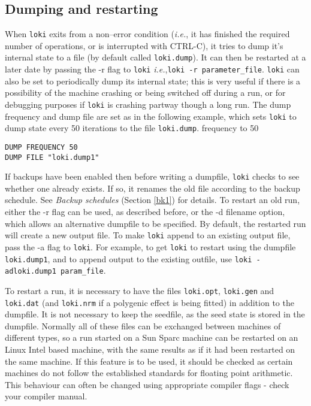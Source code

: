 \documentclass[10pt,a4paper]{article}
\newcommand{\IE}{\textit{i.e.},\xspace}
\newcommand{\Loki}{\texttt{loki}\xspace}
\begin{document}
\subsection{Dumping and restarting}
When \Loki exits from a non--error condition (\IE it has finished the
required number of operations, or is interrupted with CTRL-C), it tries to
dump it's internal state to a file (by default called \verb+loki.dump+).  It
can then be restarted at a later date by passing the -r flag to \Loki
\IE\verb+loki -r parameter_file+.  \Loki can also be set to periodically
dump its internal state; this is very useful if there is a possibility of
the machine crashing or being switched off during a run, or for debugging
purposes if \Loki is crashing partway though a long run.  The dump frequency
and dump file are set as in the following example, which sets \Loki to dump
state every 50 iterations to the file \verb+loki.dump+.
frequency to 50
\begin{verbatim}
DUMP FREQUENCY 50
DUMP FILE "loki.dump1"
\end{verbatim}
If backups have been enabled then before writing a dumpfile, \Loki checks to
see whether one already exists. If so, it renames the old file according to
the backup schedule.  See \emph{Backup schedules} (Section \ref{bk1}) for
details.  To restart an old run, either the -r flag can be used, as
described before, or the -d filename option, which allows an alternative
dumpfile to be specified.  By default, the restarted run will create a new
output file.  To make \Loki append to an existing output file, pass the -a
flag to \Loki. For example, to get \Loki to restart using the dumpfile
\verb+loki.dump1+, and to append output to the existing outfile, use
\verb+loki -adloki.dump1 param_file+.

To restart a run, it is necessary to have the files \verb+loki.opt+,
\verb+loki.gen+ and \verb+loki.dat+ (and \verb+loki.nrm+ if a polygenic
effect is being fitted) in addition to the dumpfile.  It is not
necessary to keep the seedfile, as the seed state is stored in the dumpfile.
Normally all of these files can be exchanged between machines of different
types, so a run started on a Sun Sparc machine can be restarted on an Linux
Intel based machine, with the same results as if it had been restarted on
the same machine.  If this feature is to be used, it should be checked as
certain machines do not follow the established standards for
floating point arithmetic.  This behaviour can often be changed using
appropriate compiler flags - check your compiler manual.
\end{document}
